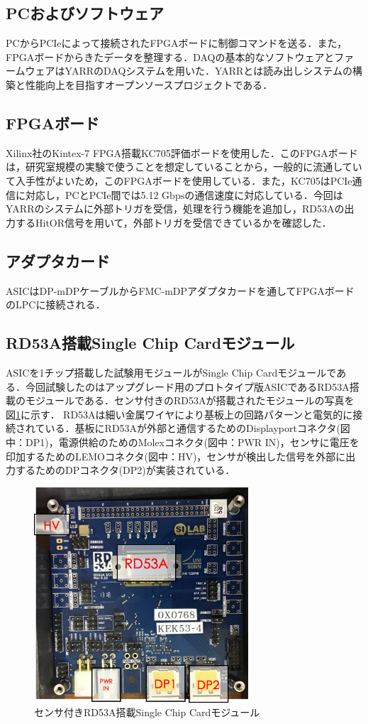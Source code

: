 \subsection*{PCおよびソフトウェア}
PCからPCIeによって接続されたFPGAボードに制御コマンドを送る．また，FPGAボードからきたデータを整理する．DAQの基本的なソフトウェアとファームウェアはYARRのDAQシステムを用いた．YARRとは読み出しシステムの構築と性能向上を目指すオープンソースプロジェクトである．

\subsection*{FPGAボード}
Xilinx社のKintex-7 FPGA搭載KC705評価ボードを使用した．このFPGAボードは，研究室規模の実験で使うことを想定していることから，一般的に流通していて入手性がよいため，このFPGAボードを使用している．また，KC705はPCIe通信に対応し，PCとPCIe間では5.12 $\mathrm{Gbps}$の通信速度に対応している．今回はYARRのシステムに外部トリガを受信，処理を行う機能を追加し，RD53Aの出力するHitOR信号を用いて，外部トリガを受信できているかを確認した．

\subsection*{アダプタカード}
ASICはDP-mDPケーブルからFMC-mDPアダプタカードを通してFPGAボードのLPCに接続される．

\subsection*{RD53A搭載Single Chip Cardモジュール}
ASICを1チップ搭載した試験用モジュールがSingle Chip Cardモジュールである．今回試験したのはアップグレード用のプロトタイプ版ASICであるRD53A搭載のモジュールである．センサ付きのRD53Aが搭載されたモジュールの写真を図\ref{fig:rd53ascc}に示す．
RD53Aは細い金属ワイヤにより基板上の回路パターンと電気的に接続されている．基板にRD53Aが外部と通信するためのDisplayportコネクタ(図中：DP1)，電源供給のためのMolexコネクタ(図中：PWR IN)，センサに電圧を印加するためのLEMOコネクタ(図中：HV)，センサが検出した信号を外部に出力するためのDPコネクタ(DP2)が実装されている．
\begin{figure}[h]
  \centering
  \includegraphics[width=8cm]{./figure/rd53a.png}
  \caption{センサ付きRD53A搭載Single Chip Cardモジュール}
  \label{fig:rd53ascc}
\end{figure}

